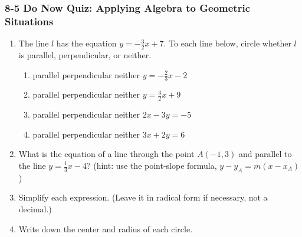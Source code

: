 \documentclass[12pt, twoside]{article}
\begin{document}
\subsubsection*{8-5 Do Now Quiz: Applying Algebra to Geometric Situations}
  \begin{enumerate}

  \item The line $l$ has the equation $y=-\frac{3}{2}x+7$. To each line below, circle whether $l$ is parallel, perpendicular, or neither.
    \begin{enumerate}
      \item parallel \quad perpendicular \quad neither \qquad $y=-\frac{2}{3}x-2$
      \vspace{0.5cm}
      \item parallel \quad perpendicular \quad neither \qquad $y=\frac{3}{2}x+9$
      \vspace{0.5cm}
      \item parallel \quad perpendicular \quad neither \qquad $2x-3y=-5$
      \vspace{1.5cm}
      \item parallel \quad perpendicular \quad neither \qquad $3x+2y=6$
      \vspace{1.7cm}
    \end{enumerate}

    \item What is the equation of a line through the point $A(-1,3)$ and parallel to the line $y=\frac{1}{3}x-4$? (hint: use the point-slope formula, $y-y_A=m (x-x_A)$) \vspace{1.5cm}

  \item Simplify each expression. (Leave it in radical form if necessary, not a decimal.)
    \begin{enumerate}
    \end{enumerate}
    \vspace{0.5cm}


  \item Write down the center and radius of each circle.
    \begin{enumerate}
    \end{enumerate}  \vspace{2cm}


\end{enumerate}
\end{document}
